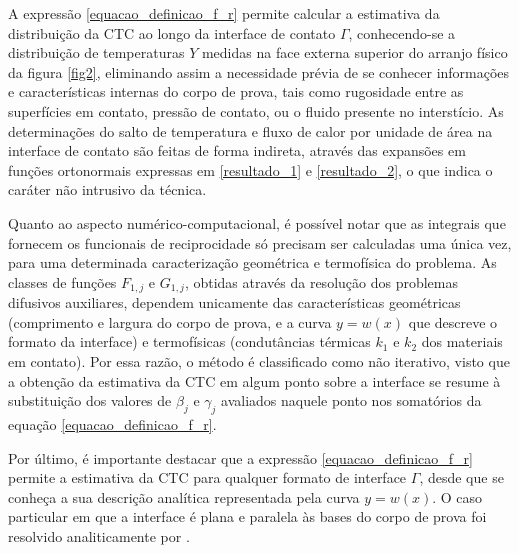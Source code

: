 A expressão \eqref{equacao_definicao_f_r} permite calcular a estimativa da distribuição da CTC ao longo da interface de contato $\Gamma$, conhecendo-se
a distribuição de temperaturas $Y$ medidas na face externa superior do arranjo físico da figura \ref{fig2}, eliminando assim a necessidade prévia de
se conhecer informações e características internas do corpo de prova, tais como rugosidade entre as superfícies em contato, pressão de contato, ou
o fluido presente no interstício. As determinações do salto de temperatura e fluxo de calor por unidade de área na interface de contato são feitas de forma indireta, através
das expansões em funções ortonormais expressas em \eqref{resultado_1} e \eqref{resultado_2}, o que indica o caráter não intrusivo da técnica.

Quanto ao aspecto numérico-computacional, é possível notar que as integrais que fornecem os funcionais de reciprocidade só precisam ser calculadas
uma única vez, para uma determinada caracterização geométrica e termofísica do problema. As classes de funções $F_{1,j}$ e $G_{1,j}$, obtidas através da resolução dos
problemas difusivos auxiliares, dependem unicamente das
características geométricas (comprimento e largura do corpo de prova, e a curva $y = w(x)$ que descreve o formato da interface)
e termofísicas (condutâncias térmicas $k_1$ e $k_2$ dos materiais em contato). Por essa razão, o método é classificado como não iterativo, visto que
a obtenção da estimativa da CTC em algum ponto sobre a interface se resume à substituição dos valores de $\beta_j$ e $\gamma_j$ avaliados naquele
ponto nos somatórios da equação \eqref{equacao_definicao_f_r}.

Por último, é importante destacar que a expressão \eqref{equacao_definicao_f_r} permite a estimativa da CTC para qualquer formato de interface $\Gamma$,
desde que se conheça a sua descrição analítica representada pela curva $y = w(x)$. O caso particular em que a interface é plana e paralela às bases do corpo
de prova foi resolvido analiticamente por \cite{tese_padilha}.

% 
